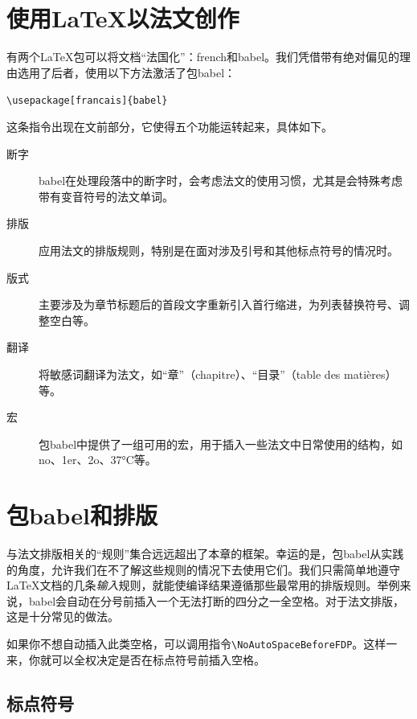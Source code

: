 \section{使用\LaTeX 以法文创作}

有两个\LaTeX 包可以将文档``法国化''：\textsf{french}和\textsf{babel}。我们凭借带有绝对偏见的理由选用了后者，使用以下方法激活了包\textsf{babel}：

\begin{dmd}
\verb|\usepackage[francais]{babel}|
\end{dmd}

这条指令出现在文前部分，它使得五个功能运转起来，具体如下。

\begin{description}
    \item[断字] \textsf{babel}在处理段落中的断字时，会考虑法文的使用习惯，尤其是会特殊考虑带有变音符号的法文单词。
    \item[排版] 应用法文的排版规则，特别是在面对涉及引号和其他标点符号的情况时。
    \item[版式] 主要涉及为章节标题后的首段文字重新引入首行缩进，为列表替换符号、调整空白等。
    \item[翻译] 将敏感词翻译为法文，如``章''（chapitre）、``目录''（table des matières）等。
    \item[宏] 包\textsf{babel}中提供了一组可用的宏，用于插入一些法文中日常使用的结构，如no、1er、2o、37°C等。
\end{description}

\section{包\textsf{babel}和排版}

与法文排版相关的``规则''集合远远超出了本章的框架。幸运的是，包\textsf{babel}从实践的角度，允许我们在不了解这些规则的情况下去使用它们。我们只需简单地遵守\LaTeX 文档的几条\emph{输入}规则，就能使编译结果遵循那些最常用的排版规则。举例来说，\textsf{babel}会自动在分号前插入一个无法打断的四分之一全空格。对于法文排版，这是十分常见的做法。

\begin{ii}
如果你不想自动插入此类空格，可以调用指令\verb|\NoAutoSpaceBeforeFDP|。这样一来，你就可以全权决定是否在标点符号前插入空格。
\end{ii}

\subsection{标点符号}

